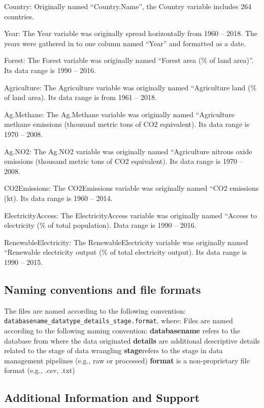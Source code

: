 \documentclass[12pt,]{article}
\begin{document}
Country: Originally named ``Country.Name'', the Country variable
includes 264 countries.

Year: The Year variable was originally spread horizontally from 1960 --
2018. The years were gathered in to one column named ``Year'' and
formatted as a date.

Forest: The Forest variable was originally named ``Forest area (\% of
land area)''. Its data range is 1990 -- 2016.

Agriculture: The Agriculture variable was originally named ``Agriculture
land (\% of land area). Its data range is from 1961 -- 2018.

Ag.Methane: The Ag.Methane variable was originally named ``Agriculture
methane emissions (thousand metric tons of CO2 equivalent). Its data
range is 1970 -- 2008.

Ag.NO2: The Ag.NO2 variable was originally named ``Agriculture nitrous
oxide emissions (thousand metric tons of CO2 equivalent). Its data range
is 1970 -- 2008.

CO2Emissions: The CO2Emissions variable was originally named ``CO2
emissions (kt). Its data range is 1960 -- 2014.

ElectricityAccess: The ElectricityAccess variable was originally named
``Access to electricity (\% of total population). Data range is 1990 --
2016.

RenewableElectricity: The RenewableElectricity variable was originally
named ``Renewable electricity output (\% of total electricity output).
Its data range is 1990 -- 2015.

\subsection{Naming conventions and file
formats}\label{naming-conventions-and-file-formats}

The files are named according to the following convention:
\texttt{databasename\_datatype\_details\_stage.format}, where: Files are
named according to the following naming convention:
\textbf{databasename} refers to the database from where the data
originated \textbf{details} are additional descriptive details related
to the stage of data wrangling \textbf{stage}refers to the stage in data
management pipelines (e.g., raw or processed) \textbf{format} is a
non-proprietary file format (e.g., .csv, .txt)

\subsection{Additional Information and
Support}\label{additional-information-and-support}
\end{document}
